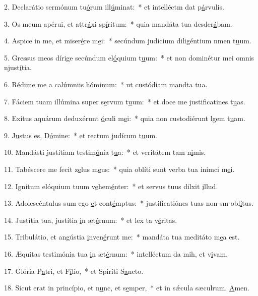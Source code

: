 2. Declarátio sermónum tu\uline{ó}rum ill\uline{ú}minat:~* et intelléctm dat p\uline{á}rvulis.\par 
3. Os meum apérui, et attr\uline{á}xi sp\uline{í}ritum:~* quia mandáta tua desder\uline{á}bam.\par 
4. Aspice in me, et miser\uline{é}re m\uline{e}i:~* secúndum judícium diligéntium nmen t\uline{u}um.\par 
5. Gressus meos dírige secúndum el\uline{ó}quium t\uline{u}um:~* et non dominétur mei omnis njust\uline{í}tia.\par 
6. Rédime me a cal\uline{ú}mniis h\uline{ó}minum:~* ut custódiam mandta t\uline{u}a.\par 
7. Fáciem tuam illúmina super s\uline{e}rvum t\uline{u}um:~* et doce me justificatines t\uline{u}as.\par 
8. Exitus aquárum deduxérunt \uline{ó}culi m\uline{e}i:~* quia non custodiérunt lgem t\uline{u}am.\par 
9. J\uline{u}stus es, D\uline{ó}mine:~* et rectum judícum t\uline{u}um.\par 
10. Mandásti justítiam testim\uline{ó}nia t\uline{u}a:~* et veritátem tam n\uline{i}mis.\par 
11. Tabéscere me fecit z\uline{e}lus m\uline{e}us:~* quia oblíti sunt verba tua inimci m\uline{e}i.\par 
12. Ignítum elóquium tuum v\uline{e}hem\uline{é}nter:~* et servus tuus dilxit \uline{i}llud.\par 
13. Adolescéntulus sum ego \uline{e}t cont\uline{é}mptus:~* justificatiónes tuas non sm obl\uline{í}tus.\par 
14. Justítia tua, justítia \uline{i}n æt\uline{é}rnum:~* et lex ta v\uline{é}ritas.\par 
15. Tribulátio, et angústia \uline{i}nven\uline{é}runt me:~* mandáta tua meditáto m\uline{e}a est.\par 
16. Æquitas testimónia tua \uline{i}n æt\uline{é}rnum:~* intelléctum da mih, et v\uline{i}vam.\par 
17. Glória P\uline{a}tri, et F\uline{í}lio,~* et Spiríti S\uline{a}ncto.\par 
18. Sicut erat in princípio, et n\uline{u}nc, et s\uline{e}mper,~* et in sǽcula sæculrum. \uline{A}men.\par 
